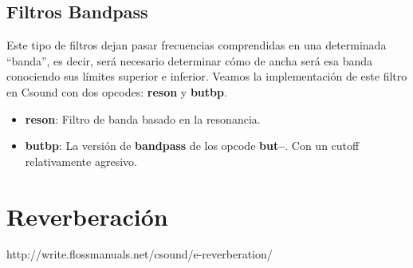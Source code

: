 \subsection{Filtros Bandpass}
Este tipo de filtros dejan pasar frecuencias comprendidas en una determinada ``banda'', es decir, será necesario determinar cómo de ancha será esa banda conociendo sus límites superior e inferior. Veamos la implementación de este filtro en Csound con dos opcodes: \textbf{reson} y \textbf{butbp}.
\begin{itemize}
 \item \textbf{reson}: Filtro de banda basado en la resonancia.
 \item \textbf{butbp}: La versión de \textbf{bandpass} de los opcode \textbf{but--}. Con un cutoff relativamente agresivo. 
\end{itemize}

\section{Reverberación}
http://write.flossmanuals.net/csound/e-reverberation/
 

